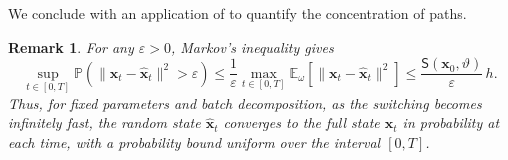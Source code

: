 \documentclass[twoside,11pt]{article}
\theoremstyle{plain}
\newtheorem{remark}[theorem]{Remark}
\def\E{\mathbb E}
\def\to{\rightarrow}
\newcommand{\bfx}{\mathbf{x}}
\begin{document}
We conclude with an application of  to quantify the concentration of paths.

\begin{remark}
For any $\varepsilon>0$, Markov's inequality gives
\begin{equation*}
\sup_{t\in[0,T]}\mathbb{P}\left(\|\mathbf{x}_t - \hat{\mathbf{x}}_t\|^2 > \varepsilon \right)
\le \frac{1}{\varepsilon}\max_{t\in[0,T]}\E_{\omega}\left[\|\bfx_t-\hat{\bfx}_t\|^2\right] \leq \frac{\mathsf{S}(\bfx_0,\vartheta) }{\varepsilon}\,h.
\end{equation*}
Thus, for fixed parameters and batch decomposition, as the switching becomes infinitely fast, the random state $\hat{\bfx}_t$ converges to the full state $\bfx_t$ in probability at each time, with a probability bound uniform over the interval $[0,T]$.
\end{remark}


\end{document}
